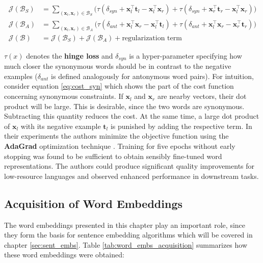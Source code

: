 \begin{align}
	\label{eq:cost_syn}
	\mathcal{J}(\mathcal{B}_S)
		&=\sum_{(\bm{x}_l, \bm{x}_r) \in \mathcal{B}_S}
			\big(\tau(\delta_{syn} + \bm{x}_l^{\intercal} \bm{t}_l - \bm{x}_l^{\intercal} \bm{x}_r) +
			\tau(\delta_{syn} + \bm{x}_r^{\intercal} \bm{t}_r - \bm{x}_l^{\intercal} \bm{x}_r)\big) \\
	\label{eq:cost_ant}
	\mathcal{J}(\mathcal{B}_A) 
		&=\sum_{(\bm{x}_l, \bm{x}_r) \in \mathcal{B}_A}
			\big(\tau(\delta_{ant} + \bm{x}_l^{\intercal} \bm{x}_r - \bm{x}_l^{\intercal} \bm{t}_l) +
			\tau(\delta_{ant} + \bm{x}_l^{\intercal} \bm{x}_r - \bm{x}_r^{\intercal} \bm{t}_r)\big) \\
	\mathcal{J}(\mathcal{B})
		&= \mathcal{J}(\mathcal{B}_S) + \mathcal{J}(\mathcal{B}_A) + \text{regularization term}
\end{align}

$\tau(x)$ denotes the \textbf{hinge loss} and $\delta_{syn}$ is a hyper-parameter specifying how much closer the synonymous words should be in contrast to the negative examples ($\delta_{ant}$ is defined analogously for antonymous word pairs). For intuition, consider equation \vref{eq:cost_syn} which shows the part of the cost function concerning synonymous constraints. If $\bm{x}_l$ and $\bm{x}_r$ are nearby vectors, their dot product will be large. This is desirable, since the two words are synonymous. Subtracting this quantity reduces the cost. At the same time, a large dot product of $\bm{x}_l$ with its negative example $\bm{t}_l$ is punished by adding the respective term. In their experiments the authors minimize the objective function using the \textbf{AdaGrad} optimization technique \citep{Duchi.2011}. Training for five epochs without early stopping was found to be sufficient to obtain sensibly fine-tuned word representations. The authors could produce significant quality improvements for low-resource languages and observed enhanced performance in downstream tasks.

\subsection{Acquisition of Word Embeddings}
\label{sec:word_embs_acquisition}

The word embeddings presented in this chapter play an important role, since they form the basis for sentence embedding algorithms which will be covered in  chapter \vref{sec:sent_embs}. Table \vref{tab:word_embs_acquisition} summarizes how these word embeddings were obtained:

